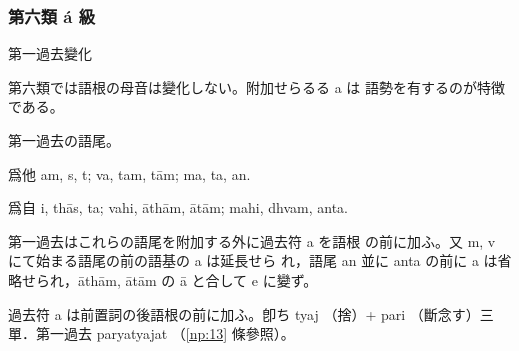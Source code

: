 \subsubsection{第六類 á 級}
\begin{center}第一過去變化\end{center}

\numberParagraph
第六類では語根の母音は變化しない。附加せらるる a は
語勢を有するのが特徴である。

\numberParagraph 第一過去の語尾。

爲他 am, s, t; va, tam, tām; ma, ta, an.

爲自 i, thās, ta; vahi, āthām, ātām; mahi, dhvam, anta.

\numberParagraph
第一過去はこれらの語尾を附加する外に過去符 a を語根
の前に加ふ。又 m, v にて始まる語尾の前の語基の a は延長せら
れ，語尾 an 並に anta の前に a は省略せられ，āthām, ātām
の ā と合して e に變ず。

過去符 a は前置詞の後語根の前に加ふ。卽ち tyaj （捨）+ pari
（斷念す）三單．第一過去 paryatyajat （\ref{np:13} 條參照）。


\newpage
\theendnotes


